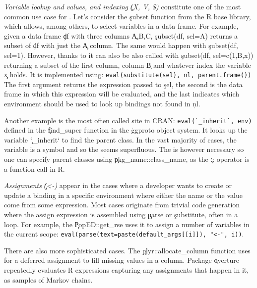 \documentclass[review,screen,acmsmall,anonymous=true]{acmart}
\begin{document}
\begin{compactitem}[---]

  \item \emph{Variable lookup and values, and indexing \c{(X, V, \$)}}
    constitute one of the most common use case for \eval. Let's consider the
    \c{subset} function from the R base library, which allows, among others, to
    select variables in a data frame. For example, given a data frame \c{df}
    with three columns \c{A,B,C}, \c{subset(df, sel=A)} returns a subset of
    \c{df} with just the \c{A} column. The same would happen with \c{subset(df,
    sel=1)}. However, thanks to \eval it can also be also called with
    \c{subset(df, sel=c(1,B,x))} returning a subset of the first column, column
    \c{B} and whatever index the variable \c{x} holds. It is implemented using:
    \lstinline|eval(substitute(sel), nl, parent.frame())| The first argument
    returns the expression passed to \c{sel}, the second is the data frame in
    which this expression will be evaluated, and the last indicates
    which environment should be used to look up bindings not found in \c{nl}.

    Another example is the most often called \eval site in CRAN:
    \lstinline|eval(`_inherit`, env)| defined in the \c{find\_super} function
    in the \c{ggproto} object system. It looks up the variable \c{`\_inherit`} to
    find the parent class. In the vast majority of cases, the variable is a symbol
    and so the \eval seems superfluous. The \eval is however necessary so one
    can specify parent classes using \c{pkg\_name::class\_name}, as the \c{::}
    operator is a function call in R.

  \item \emph{Assignments \c{(<-)}} appear in the cases where a developer wants
    to create or update a binding in a specific environment where either the
    name or the value come from some expression. Most cases originate from
    trivial code generation where the assign expression is assembled using
    \c{parse} or \c{substitute}, often in a loop. For example, the
    \c{PopED::get\_rse} uses it to assign a number of variables in the current
    scope: \lstinline|eval(parse(text=paste(default_args[[i]]), "<-", i))|. 

    There are also more sophisticated cases. The \c{plyr::allocate\_column}
    function uses \eval for a deferred assignment to fill missing values in a
    column. Package \c{overture} repeatedly evaluates R expressions capturing any  assignments that happen in it, as samples of Markov chains.


\end{compactitem}
\end{document}
